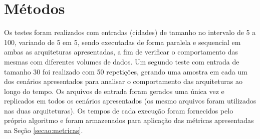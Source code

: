 \section{Métodos}
\label{secao:metodos}

Os testes foram realizados com entradas (cidades) de tamanho no intervalo de 5 a 100, variando de 5 em 5, sendo executadas de forma paralela e sequencial em ambas as arquiteturas apresentadas, a fim de verificar o comportamento das mesmas com diferentes volumes de dados. Um segundo teste com entrada de tamanho 30 foi realizado com 50 repetições, gerando uma amostra em cada um dos cenários apresentados para analisar o comportamento das arquiteturas ao longo do tempo. Os arquivos de entrada foram gerados uma única vez e replicados em todos os cenários apresentados (os mesmo arquivos foram utilizados nas duas arquiteturas). Os tempos de cada execução foram fornecidos pelo próprio algoritmo e foram armazenados para aplicação das métricas apresentadas na Seção \ref{secao:metricas}.